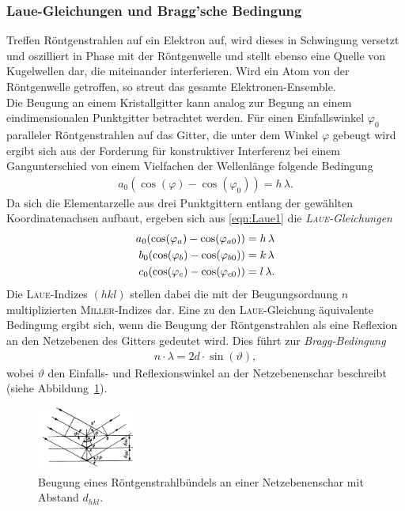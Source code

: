 \documentclass[a4paper,twoside,final]{article}
\begin{document}
\subsubsection{Laue-Gleichungen und Bragg'sche Bedingung}
Treffen Röntgenstrahlen auf ein Elektron auf, wird dieses in Schwingung versetzt und oszilliert in Phase mit der Röntgenwelle und stellt ebenso eine Quelle von Kugelwellen dar, die miteinander interferieren. Wird ein Atom von der Röntgenwelle getroffen, so streut das gesamte Elektronen-Ensemble.\\
Die Beugung an einem Kristallgitter kann analog zur Begung an einem eindimensionalen Punktgitter betrachtet werden. Für einen Einfallswinkel $\varphi_0$ paralleler Röntgenstrahlen auf das Gitter, die unter dem Winkel $\varphi$ gebeugt wird ergibt sich aus der Forderung für konstruktiver Interferenz bei einem Gangunterschied von einem Vielfachen der Wellenlänge folgende Bedingung
\begin{align}
  a_0 (\cos(\varphi) - \cos(\varphi_0)) = h\,\lambda.\label{eqn:Laue1}
\end{align}
Da sich die Elementarzelle aus drei Punktgittern entlang der gewählten Koordinatenachsen aufbaut, ergeben sich aus \eqref{eqn:Laue1} die \textit{\textsc{Laue}-Gleichungen}
\begin{align}\label{eqn:Laue2}
  a_0 (\cos(\varphi_a) - \cos(\varphi_{a0})) &= h\,\lambda\notag\\
  b_0 (\cos(\varphi_b) - \cos(\varphi_{b0})) &= k\,\lambda\\
  c_0 (\cos(\varphi_c) - \cos(\varphi_{c0})) &= l\,\lambda\notag.
\end{align}
Die \textsc{Laue}-Indizes $(hkl)$ stellen dabei die mit der Beugungsordnung $n$ multiplizierten \textsc{Miller}-Indizes dar.
Eine zu den \textsc{Laue}-Gleichung äquivalente Bedingung ergibt sich, wenn die Beugung der Röntgenstrahlen als eine Reflexion an den Netzebenen des Gitters gedeutet wird.  Dies führt zur \textit{Bragg-Bedingung}
\begin{align}
  n\cdot \lambda = 2d\cdot \sin(\vartheta)\label{eqn:Bragg},
\end{align}
wobei $\vartheta$ den Einfalls- und Reflexionswinkel an der Netzebenenschar beschreibt (siehe Abbildung~\ref{fig:Roentgenbeugung}).
\begin{figure}[htp]
    \centering
    \includegraphics[width=0.3\textwidth]{Abbildungen/Roentgenbeugung.pdf}
    \caption{Beugung eines Röntgenstrahlbündels an einer Netzebenenschar mit Abstand $d_{hkl}$.~\cite[S.367]{Kleber}}
    \label{fig:Roentgenbeugung}
\end{figure}\\
\end{document}
